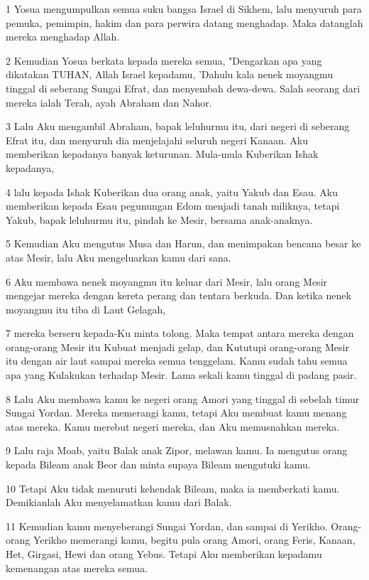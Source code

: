 \par 1 Yosua mengumpulkan semua suku bangsa Israel di Sikhem, lalu menyuruh para pemuka, pemimpin, hakim dan para perwira datang menghadap. Maka datanglah mereka menghadap Allah.
\par 2 Kemudian Yosua berkata kepada mereka semua, "Dengarkan apa yang dikatakan TUHAN, Allah Israel kepadamu, 'Dahulu kala nenek moyangmu tinggal di seberang Sungai Efrat, dan menyembah dewa-dewa. Salah seorang dari mereka ialah Terah, ayah Abraham dan Nahor.
\par 3 Lalu Aku mengambil Abraham, bapak leluhurmu itu, dari negeri di seberang Efrat itu, dan menyuruh dia menjelajahi seluruh negeri Kanaan. Aku memberikan kepadanya banyak keturunan. Mula-mula Kuberikan Ishak kepadanya,
\par 4 lalu kepada Ishak Kuberikan dua orang anak, yaitu Yakub dan Esau. Aku memberikan kepada Esau pegunungan Edom menjadi tanah miliknya, tetapi Yakub, bapak leluhurmu itu, pindah ke Mesir, bersama anak-anaknya.
\par 5 Kemudian Aku mengutus Musa dan Harun, dan menimpakan bencana besar ke atas Mesir, lalu Aku mengeluarkan kamu dari sana.
\par 6 Aku membawa nenek moyangmu itu keluar dari Mesir, lalu orang Mesir mengejar mereka dengan kereta perang dan tentara berkuda. Dan ketika nenek moyangmu itu tiba di Laut Gelagah,
\par 7 mereka berseru kepada-Ku minta tolong. Maka tempat antara mereka dengan orang-orang Mesir itu Kubuat menjadi gelap, dan Kututupi orang-orang Mesir itu dengan air laut sampai mereka semua tenggelam. Kamu sudah tahu semua apa yang Kulakukan terhadap Mesir. Lama sekali kamu tinggal di padang pasir.
\par 8 Lalu Aku membawa kamu ke negeri orang Amori yang tinggal di sebelah timur Sungai Yordan. Mereka memerangi kamu, tetapi Aku membuat kamu menang atas mereka. Kamu merebut negeri mereka, dan Aku memusnahkan mereka.
\par 9 Lalu raja Moab, yaitu Balak anak Zipor, melawan kamu. Ia mengutus orang kepada Bileam anak Beor dan minta supaya Bileam mengutuki kamu.
\par 10 Tetapi Aku tidak menuruti kehendak Bileam, maka ia memberkati kamu. Demikianlah Aku menyelamatkan kamu dari Balak.
\par 11 Kemudian kamu menyeberangi Sungai Yordan, dan sampai di Yerikho. Orang-orang Yerikho memerangi kamu, begitu pula orang Amori, orang Feris, Kanaan, Het, Girgasi, Hewi dan orang Yebus. Tetapi Aku memberikan kepadamu kemenangan atas mereka semua.
